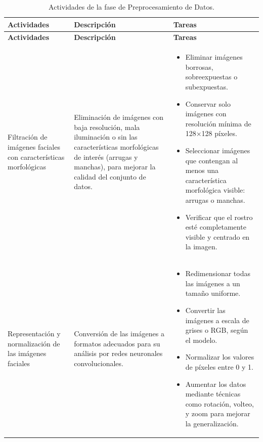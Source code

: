 \begin{longtable}{p{3cm}p{3cm}p{9cm}}
    \caption{Actividades de la fase de Preprocesamiento de Datos.}
    \label{tabla:preprocesamiento}\\
    \toprule
    \textbf{Actividades} & \textbf{Descripción} & \textbf{Tareas} \\
    \midrule
    \endfirsthead

    \toprule
    \textbf{Actividades} & \textbf{Descripción} & \textbf{Tareas} \\
    \midrule
    \endhead

    \bottomrule
    \endfoot

    \bottomrule
    \endlastfoot

    Filtración de imágenes faciales con características morfológicas & Eliminación de imágenes con baja resolución, mala iluminación o sin las características morfológicas de interés (arrugas y manchas), para mejorar la calidad del conjunto de datos. & 
    \begin{itemize}
        \item Eliminar imágenes borrosas, sobreexpuestas o subexpuestas.
        \item Conservar solo imágenes con resolución mínima de 128×128 píxeles.
        \item Seleccionar imágenes que contengan al menos una característica morfológica visible: arrugas o manchas.
        \item Verificar que el rostro esté completamente visible y centrado en la imagen.
    \end{itemize} \\

    Representación y normalización de las imágenes faciales & Conversión de las imágenes a formatos adecuados para su análisis por redes neuronales convolucionales. & 
    \begin{itemize}
        \item Redimensionar todas las imágenes a un tamaño uniforme.
        \item Convertir las imágenes a escala de grises o RGB, según el modelo.
        \item Normalizar los valores de píxeles entre 0 y 1.
        \item Aumentar los datos mediante técnicas como rotación, volteo, y zoom para mejorar la generalización.
    \end{itemize} \\

\end{longtable}

